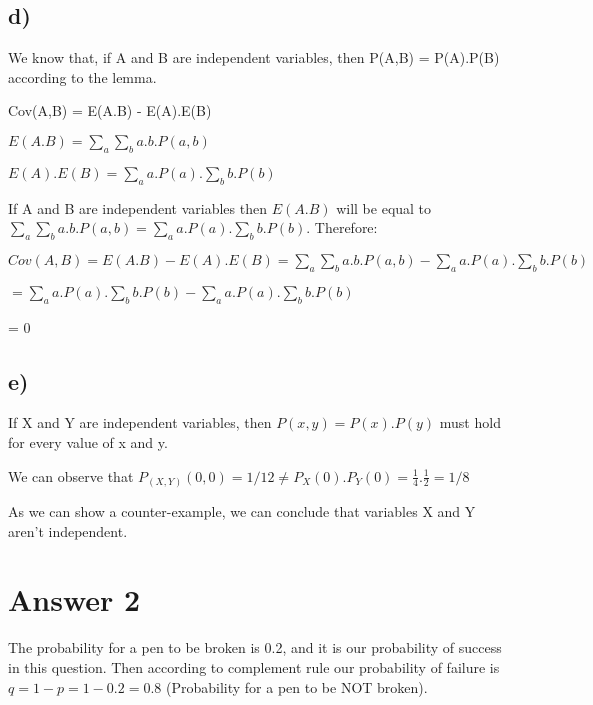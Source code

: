 \documentclass[12pt]{article}
\begin{document}
\subsection*{d)}
We know that, if A and B are independent variables, then P(A,B) = P(A).P(B) according to the lemma.\\ \par 
Cov(A,B) = E(A.B) - E(A).E(B)\\ \par
$E(A.B) = \sum_a \sum_b a.b.P(a,b)$\\ \par 
$E(A).E(B) = \sum_a a.P(a). \sum_b b.P(b)$\\ \par 
If A and B are independent variables then $E(A.B)$ will be equal to $\sum_a \sum_b a.b.P(a,b) = \sum_a a.P(a). \sum_b b.P(b)$. Therefore:\\ \par 
$Cov(A,B) = E(A.B) - E(A).E(B) = \sum_a \sum_b a.b.P(a,b) - \sum_a a.P(a). \sum_b b.P(b)$ \\ \par 
$= \sum_a a.P(a). \sum_b b.P(b) - \sum_a a.P(a). \sum_b b.P(b)$\\ \par 
= 0
\subsection*{e)}
If X and Y are independent variables, then $P(x,y) = P(x).P(y)$ must hold for every value of x and y.\par
We can observe that $P_{(X,Y)}(0,0) = 1/12 \neq P_X(0).P_Y(0) = \frac{1}{4} . \frac{1}{2} = 1/8$ \par 
As we can show a counter-example, we can conclude that variables X and Y aren't independent.
\section*{Answer 2}
The probability for a pen to be broken is 0.2, and it is our probability of success in this question. Then according to complement rule our probability of failure is $q = 1 - p = 1 - 0.2 = 0.8$ (Probability for a pen to be NOT broken).  
\end{document}
